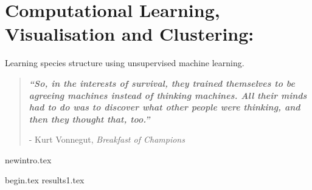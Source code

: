 

\chapter{ Computational Learning, Visualisation and Clustering:}
\vspace{-1cm} {\Large Learning species structure using unsupervised machine learning. } 


\blankpage
\restoregeometry
\vspace*{0.15\paperheight}


\begin{center}
\begin{quotation}
  \large{\emph{\textbf{``So, in the interests of survival, they trained themselves to be agreeing machines instead of thinking machines. All their minds had to do was to discover what other people were thinking, and then they thought that, too.''} }  }  \\
  \begin{flushright}
  - Kurt Vonnegut, \textit{Breakfast of Champions} 
  \end{flushright}
 \end{quotation}
\end{center}
\doublespacing
\newpage

%
{newintro.tex}

% 
 {begin.tex}
{results1.tex}
% 
% 



\chapterbib






